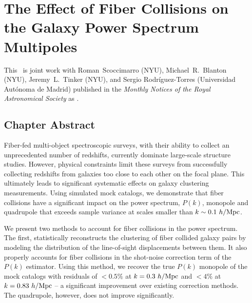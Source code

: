 \renewcommand{\chapid}{fc}
\chapter{The Effect of Fiber Collisions on the Galaxy Power Spectrum Multipoles }


This \paper\ is joint work with Roman~Scoccimarro (NYU), 
Michael~R.~Blanton (NYU), Jeremy~L.~Tinker (NYU), and Sergio Rodr\'{i}guez-Torres 
(Universidad Aut\'{o}noma de Madrid) published in the \emph{Monthly Notices of the Royal
Astronomical Society} as \cite{Hahn:2017a}. 

\newcommand{\beqa}{\begin{eqnarray}}
\newcommand{\eeqa}{\end{eqnarray}}

\newcommand{\lexp}{\mathop{\langle}}
\newcommand{\rexp}{\mathop{\rangle}}
\newcommand{\rexpc}{\mathop{\rangle_c}}
\def\k{{\hbox{\BF k}}}
\def\x{{\hbox{\BF x}}}
\def\r{{\hbox{\BF r}}}
\def\s{{\hbox{\BF s}}}
\def\la{\mathrel{\mathpalette\fun <}}
\def\ga{\mathrel{\mathpalette\fun >}}
\def\fun#1#2{\lower3.6pt\vbox{\baselineskip0pt\lineskip.9pt
\ialign{$\mathsurround=0pt#1\hfill##\hfil$\crcr#2\crcr\sim\crcr}}}

\newcommand{\beq}{\begin{equation}}
\newcommand{\eeq}{\end{equation}}


\section{Chapter Abstract}
\qquad Fiber-fed multi-object spectroscopic surveys, with their ability to collect an unprecedented number of redshifts, currently dominate large-scale structure studies. However, physical constraints limit these surveys from successfully collecting redshifts from galaxies too close to each other on the focal plane. This ultimately leads to significant systematic effects on galaxy clustering measurements. Using simulated mock catalogs, we demonstrate that fiber collisions have a significant impact on the power spectrum, $P(k)$, monopole and quadrupole that exceeds sample variance at scales smaller than $k\sim0.1~h/{\rm Mpc}$.

\qquad We present two methods to account for fiber collisions in the power spectrum. The first, statistically reconstructs the clustering of fiber collided galaxy pairs by modeling the distribution of the line-of-sight displacements between them. It also properly accounts for fiber collisions in the shot-noise correction term of the $P(k)$ estimator. Using this method, we recover the true $P(k)$ monopole of the mock catalogs with residuals of $<0.5\%$ at $k=0.3~h/{\rm Mpc}$ and $<4\%$ at $k=0.83~h/{\rm Mpc}$ -- a significant improvement over existing correction methods. The quadrupole, however, does not improve significantly.

